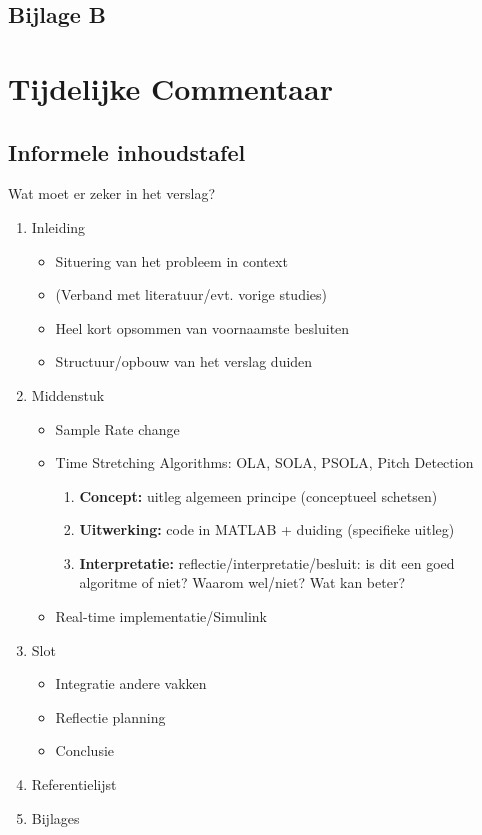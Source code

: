 \documentclass[12pt]{report}
\begin{document}
\section{Bijlage B}





\chapter{Tijdelijke Commentaar}

\section{Informele inhoudstafel}
Wat moet er zeker in het verslag?
\begin{enumerate}
\item Inleiding
\begin{itemize}
\item Situering van het probleem in context
\item (Verband met literatuur/evt. vorige studies)
\item Heel kort opsommen van voornaamste besluiten
\item Structuur/opbouw van het verslag duiden
\end{itemize}
\item Middenstuk
\begin{itemize}
\item Sample Rate change
\item Time Stretching Algorithms: OLA, SOLA, PSOLA, Pitch Detection
\begin{enumerate}
\item \textbf{Concept:} uitleg algemeen principe (conceptueel schetsen)
\item \textbf{Uitwerking:} code in MATLAB + duiding (specifieke uitleg)
\item \textbf{Interpretatie:} reflectie/interpretatie/besluit: is dit een goed algoritme of niet? Waarom wel/niet? Wat kan beter?
\end{enumerate}
\item Real-time implementatie/Simulink
\end{itemize}
\item Slot
\begin{itemize}
\item Integratie andere vakken
\item Reflectie planning
\item Conclusie
\end{itemize}
\item Referentielijst
\item Bijlages
\end{enumerate}
\end{document}
